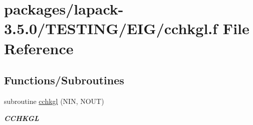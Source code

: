 \hypertarget{cchkgl_8f}{}\section{packages/lapack-\/3.5.0/\+T\+E\+S\+T\+I\+N\+G/\+E\+I\+G/cchkgl.f File Reference}
\label{cchkgl_8f}
\subsection*{Functions/\+Subroutines}
\begin{DoxyCompactItemize}
\item 
subroutine \hyperlink{group__complex__eig_ga38ae0be71db106e536d22d0982164f3e}{cchkgl} (N\+I\+N, N\+O\+U\+T)
\begin{DoxyCompactList}\small\item\em {\bfseries C\+C\+H\+K\+G\+L} \end{DoxyCompactList}\end{DoxyCompactItemize}
